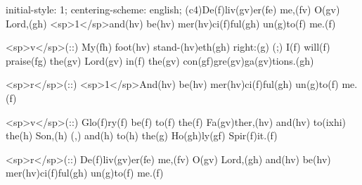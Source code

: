 initial-style: 1;
centering-scheme: english;
(c4)De(f)liv(gv)er(fe) me,(fv) O(gv) Lord,(gh) <sp>1</sp>and(hv) be(hv) mer(hv)ci(f)ful(gh) un(g)to(f) me.(f)

<sp>v</sp>(::) My(fh) foot(hv) stand-(hv)eth(gh) right:(g) (;) I(f) will(f) praise(fg) the(gv) Lord(gv) in(f) the(gv) con(gf)gre(gv)ga(gv)tions.(gh)

<sp>r</sp>(::) <sp>1</sp>And(hv) be(hv) mer(hv)ci(f)ful(gh) un(g)to(f) me.(f)

<sp>v</sp>(::) Glo(f)ry(f) be(f) to(f) the(f) Fa(gv)ther,(hv) and(hv) to(ixhi) the(h) Son,(h) (,) and(h) to(h) the(g) Ho(gh)ly(gf) Spir(f)it.(f)

<sp>r</sp>(::) De(f)liv(gv)er(fe) me,(fv) O(gv) Lord,(gh) and(hv) be(hv) mer(hv)ci(f)ful(gh) un(g)to(f) me.(f)